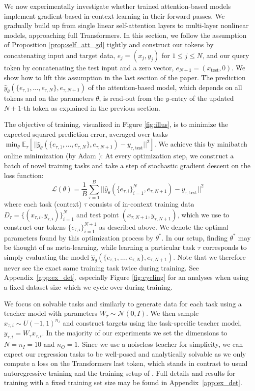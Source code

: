 \documentclass{article}
\theoremstyle{plain}
\theoremstyle{definition}
\theoremstyle{remark}
\begin{document}
We now experimentally investigate whether trained attention-based models implement gradient-based in-context learning in their forward passes. We gradually build up from single linear self-attention layers to multi-layer nonlinear models, approaching full Transformers. In this section, we follow the assumption of Proposition \ref{prop:self_att_gd} tightly and construct our tokens by concatenating input and target data, $e_j = (x_j, y_j)$ for $1\leq j \leq N$, and our query token by concatenating the test input and a zero vector, $e_{N+1} = (x_{\text{test}}, 0)$. We show how to lift this assumption in the last section of the paper. The prediction $\hat{y}_{\theta}(\{e_{\tau,1}, \ldots, e_{\tau,N}\}, e_{\tau, N+1})$ of the attention-based model, which depends on all tokens and on the parameters $\theta$, is read-out from the $y$-entry of the updated $N+1$-th token as explained in the previous section. 

The objective of training, visualized in Figure \ref{fig:illus}, is to minimize the expected squared prediction error, averaged over tasks $\min_\theta \mathbb{E}_\tau [||\hat{y}_{\theta}(\{e_{\tau,1}, \ldots, e_{\tau,N}\}, e_{\tau, N+1}) - y_{\tau,\text{test}}||^2]$. We achieve this by minibatch online minimization (by Adam \citep{adam}): At every optimization step, we construct a batch of novel training tasks and take a step of stochastic gradient descent on the loss function:
\begin{equation}
\label{eq:trans_loss}
     \mathcal{L}(\theta) = \frac{1}{B} \sum_{\tau=1}^B ||\hat{y}_{\theta}(\{e_{\tau,i}\}_{i=1}^N, e_{\tau, N+1}) - y_{\tau,\text{test}}||^2
\end{equation}
where each task (context) $\tau$ consists of in-context training data  $D_\tau=\{(x_{\tau,i}, y_{\tau,i})\}_{i=1}^{N}$ and test point $(x_{\tau,N+1}, y_{\tau,N+1})$, which we use to construct our tokens $\{e_{\tau,i}\}_{i=1}^{N+1}$ as described above. We denote the optimal parameters found by this optimization process by $\theta^*$. In our setup, finding $\theta^*$ may be thought of as meta-learning, while learning a particular task $\tau$ corresponds to simply evaluating the model $\hat{y}_{\theta}(\{e_{\tau,1}, \ldots, e_{\tau,N}\}, e_{\tau, N+1})$. Note that we therefore never see the exact same training task twice during training. See Appendix~\ref{app:ex_det}, especially Figure \ref{fig:cycling} for an analyses when using a fixed dataset size which we cycle over during training.

We focus on solvable tasks and similarly to \citet{simple_case_study} generate data for each task using a teacher model with parameters $W_\tau \sim \mathcal{N}(0, I)$. We then sample $x_{\tau,i} \sim U(-1, 1)^{n_I}$ and construct targets using the task-specific teacher model, $y_{\tau,i} = W_\tau x_{\tau,i}$. In the majority of our experiments we set the dimensions to $N=n_I=10$ and $n_O=1$. Since we use a noiseless teacher for simplicity, we can expect our regression tasks to be well-posed and analytically solvable as we only compute a loss on the Transformers last token, which stands in contrast to usual autoregressive training and the training setup of \citet{simple_case_study}. 
Full details and results for training with a fixed training set size may be found in Appendix~\ref{app:ex_det}.
\end{document}
